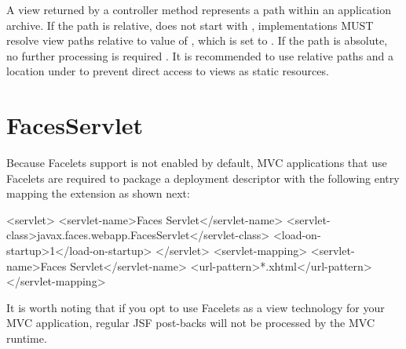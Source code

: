 A view returned by a controller method represents a path within an
application archive. If the path is relative, does not start with , implementations 
MUST resolve view paths relative to value of , 
which is set to . If the path is absolute, no further processing
is required . It is recommended to use relative paths and a 
location under  to prevent direct access to views as static resources.

\section{FacesServlet}
\label{faces_servlet}

Because Facelets support is not enabled by default, MVC applications that use Facelets are 
required to package a  deployment descriptor with the following entry
mapping the extension  as shown next:

\begin{listing}{1}
  <servlet>
      <servlet-name>Faces Servlet</servlet-name>
      <servlet-class>javax.faces.webapp.FacesServlet</servlet-class>
      <load-on-startup>1</load-on-startup>
  </servlet>
  <servlet-mapping>
      <servlet-name>Faces Servlet</servlet-name>
      <url-pattern>*.xhtml</url-pattern>
  </servlet-mapping>
\end{listing}

It is worth noting that if you opt to use Facelets as a view technology for your MVC application, regular JSF post-backs will not be processed by the MVC runtime.

